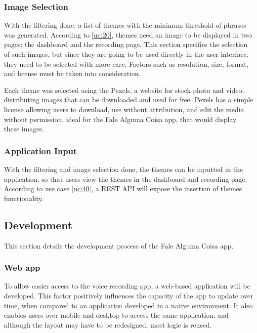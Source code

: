 \subsubsection{Image Selection}

With the filtering done, a list of themes with the minimum threshold of phrases was generated. According to \ref{uc:20}, themes need an image to be displayed in two pages: the dashboard and the recording page. This section specifies the selection of such images, but since they are going to be used directly in the user interface, they need to be selected with more care. Factors such as resolution, size, format, and license must be taken into consideration.

Each theme was selected using the Pexels, a website for stock photo and video, distributing images that can be downloaded and used for free. Pexels has a simple license allowing users to download, use without attribution, and edit the media without permission, ideal for the Fale Alguma Coisa app, that would display these images.

\subsubsection{Application Input}

With the filtering and image selection done, the themes can be inputted in the application, so that users view the themes in the dashboard and recording page. According to use case \ref{uc:40}, a REST API will expose the insertion of themes functionality.

\subsection{Development}
\label{sec:app-development}

This section details the development process of the Fale Alguma Coisa app. 

\subsubsection{Web app}

To allow easier access to the voice recording app, a web-based application will be developed. This factor positively influences the capacity of the app to update over time, when compared to an application developed in a native environment. It also enables users over mobile and desktop to access the same application, and although the layout may have to be redesigned, most logic is reused.

